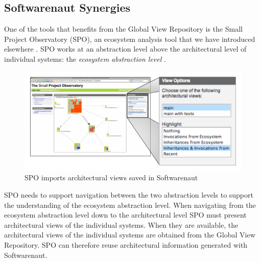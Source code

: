 \documentclass[preprint,12pt]{elsarticle}
\begin{document}



\subsection {Softwarenaut Synergies}
One of the tools that benefits from the Global View Repository is the Small Project Observatory (SPO), an ecosystem analysis tool that we have introduced elsewhere \cite{lungu-est}. SPO works at an abstraction level above the architectural level of individual systems: the {\em ecosystem abstraction level} \cite{lungu-thesis}. 

\begin{figure}[ht]
\begin{center}
\includegraphics[width=\linewidth]{SpoArchitectural}
\caption{SPO imports architectural views saved in Softwarenaut}
\label{}
\end{center}
\end{figure}


SPO needs to support navigation between the two abstraction levels to support the understanding of  the ecosystem abstraction level. When navigating from the ecosystem abstraction level down to the architectural level SPO must present architectural views of the individual systems. When they are available, the architectural views of the individual systems are obtained from the Global View Repository. SPO can therefore reuse architectural information generated with Softwarenaut.
\end{document}
